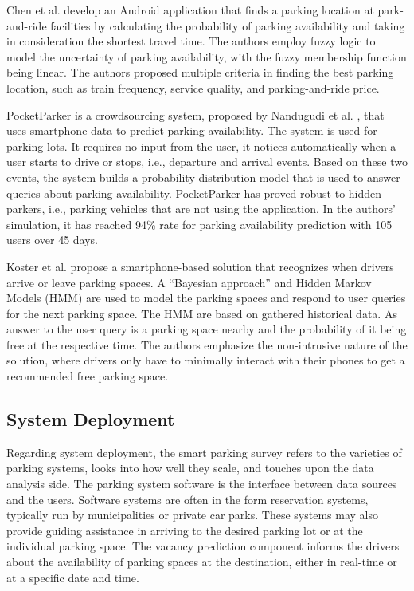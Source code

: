 \documentclass{ws-ijait}
\newcommand{\cmmnt}[1]{\ignorespaces}
\begin{document}
	Chen et al. \cmmnt{ref zchen} develop an Android application that finds a parking location at park-and-ride facilities by calculating the probability of parking availability and taking in consideration the shortest travel time. The authors employ fuzzy logic to model the uncertainty of parking availability, with the fuzzy membership function being linear. The authors proposed multiple criteria in finding the best parking location, such as train frequency, service quality, and parking-and-ride price. 
	
	PocketParker is a crowdsourcing system, proposed by Nandugudi et al. \cmmnt{ref nandugudi}, that uses smartphone data to predict parking availability. The system is used for parking lots. It requires no input from the user, it notices automatically when a user starts to drive or stops, i.e., departure and arrival events. Based on these two events, the system builds a probability distribution model that is used to answer queries about parking availability. PocketParker has proved robust to hidden parkers, i.e., parking vehicles that are not using the application. In the authors' simulation, it has reached 94\% rate for parking availability prediction with 105 users over 45 days. 
	
	Koster et al. \cmmnt{ref koster} propose a smartphone-based solution that recognizes when drivers arrive or leave parking spaces. A ``Bayesian approach'' and Hidden Markov Models (HMM) are used to model the parking spaces and respond to user queries for the next parking space. The HMM are based on gathered historical data. As answer to the user query is a parking space nearby and the probability of it being free at the respective time. The authors emphasize the non-intrusive nature of the solution, where drivers only have to minimally interact with their phones to get a recommended free parking space.
	
	\subsection{System Deployment}
	Regarding system deployment, the smart parking survey refers to the varieties of parking systems, looks into how well they scale, and touches upon the data analysis side. The parking system software is the interface between data sources and the users. Software systems are often in the form reservation systems, typically run by municipalities or private car parks. These systems may also provide guiding assistance in arriving to the desired parking lot or at the individual parking space. The vacancy prediction component informs the drivers about the availability of parking spaces at the destination, either in real-time or at a specific date and time.
	
\end{document}
